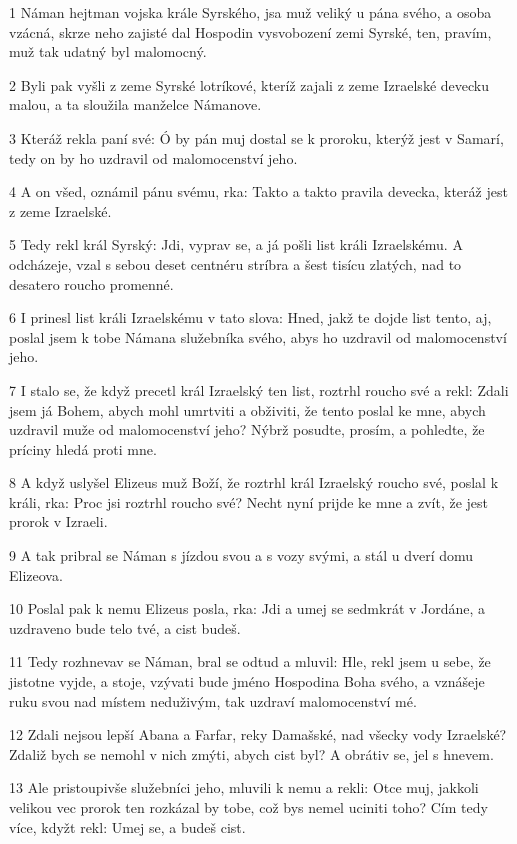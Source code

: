 \par 1 Náman hejtman vojska krále Syrského, jsa muž veliký u pána svého, a osoba vzácná, skrze neho zajisté dal Hospodin vysvobození zemi Syrské, ten, pravím, muž tak udatný byl malomocný.
\par 2 Byli pak vyšli z zeme Syrské lotríkové, kteríž zajali z zeme Izraelské devecku malou, a ta sloužila manželce Námanove.
\par 3 Kteráž rekla paní své: Ó by pán muj dostal se k proroku, kterýž jest v Samarí, tedy on by ho uzdravil od malomocenství jeho.
\par 4 A on všed, oznámil pánu svému, rka: Takto a takto pravila devecka, kteráž jest z zeme Izraelské.
\par 5 Tedy rekl král Syrský: Jdi, vyprav se, a já pošli list králi Izraelskému. A odcházeje, vzal s sebou deset centnéru stríbra a šest tisícu zlatých, nad to desatero roucho promenné.
\par 6 I prinesl list králi Izraelskému v tato slova: Hned, jakž te dojde list tento, aj, poslal jsem k tobe Námana služebníka svého, abys ho uzdravil od malomocenství jeho.
\par 7 I stalo se, že když precetl král Izraelský ten list, roztrhl roucho své a rekl: Zdali jsem já Bohem, abych mohl umrtviti a obživiti, že tento poslal ke mne, abych uzdravil muže od malomocenství jeho? Nýbrž posudte, prosím, a pohledte, že príciny hledá proti mne.
\par 8 A když uslyšel Elizeus muž Boží, že roztrhl král Izraelský roucho své, poslal k králi, rka: Proc jsi roztrhl roucho své? Necht nyní prijde ke mne a zvít, že jest prorok v Izraeli.
\par 9 A tak pribral se Náman s jízdou svou a s vozy svými, a stál u dverí domu Elizeova.
\par 10 Poslal pak k nemu Elizeus posla, rka: Jdi a umej se sedmkrát v Jordáne, a uzdraveno bude telo tvé, a cist budeš.
\par 11 Tedy rozhnevav se Náman, bral se odtud a mluvil: Hle, rekl jsem u sebe, že jistotne vyjde, a stoje, vzývati bude jméno Hospodina Boha svého, a vznášeje ruku svou nad místem neduživým, tak uzdraví malomocenství mé.
\par 12 Zdali nejsou lepší Abana a Farfar, reky Damašské, nad všecky vody Izraelské? Zdaliž bych se nemohl v nich zmýti, abych cist byl? A obrátiv se, jel s hnevem.
\par 13 Ale pristoupivše služebníci jeho, mluvili k nemu a rekli: Otce muj, jakkoli velikou vec prorok ten rozkázal by tobe, což bys nemel uciniti toho? Cím tedy více, kdyžt rekl: Umej se, a budeš cist.

